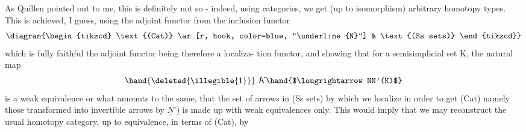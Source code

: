 As Quillen pointed out to me, this is definitely not so - indeed,
using categories, we get (up to isomorphism) arbitrary homotopy types.
This is achieved, I guess, using the  adjoint functor  from the
inclusion functor
\[ \diagram{\begin{tikzcd} \text{(Cat)} \ar[r, hook, color=blue, "\underline{N}"] & \text{(Ss sets)} \end{tikzcd}} \]
which is fully faithful \hand{(}the adjoint functor being therefore a localiza-%
tion functor\hand{)}, and showing that for a semisimplicial set K, the natural
map
\[ \hand{\deleted{\illegible{1}}}\ K \hand{$\longrightarrow NN'(K)$} \]
is a weak equivalence\hand{,} or what amounts to the same, that the set of
arrows in (Ss sets) by which we localize in order to get (Cat) \hand{(}namely
those transformed into invertible arrows by $\underline{N}$')  is made up with
weak equivalences only. This would imply that we may reconstruct the
usual homotopy category, up to equivalence, in terms of (Cat), by
